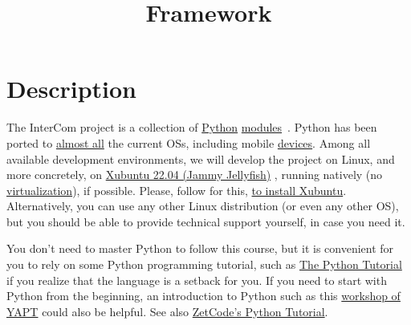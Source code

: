 
\title{Framework}

\maketitle

\section{Description}

The InterCom project \cite{intercom} is a collection of
\href{https://www.python.org/}{Python}
\href{https://docs.python.org/3/tutorial/modules.html#modules}{modules}~\cite{python}.
Python has been ported to
\href{https://www.python.org/download/other/}{almost all} the current
OSs, including mobile \href{https://kivy.org/#home}{devices}. Among
all available development environments, we will develop the project on
Linux, and more concretely, on
\href{https://xubuntu.org/download/}{Xubuntu 22.04 (Jammy Jellyfish)}
\cite{xubuntu}, running natively (no
\href{https://en.wikipedia.org/wiki/Virtualization}{virtualization}),
if possible. Please, follow for this,
\href{https://vicente-gonzalez-ruiz.github.io/Xubuntu_install/}{to
  install Xubuntu}. Alternatively, you can use any other Linux
distribution (or even any other OS), but you should be able to
provide technical support yourself, in case you need it.

You don't need to master Python to follow this course, but it is
convenient for you to rely on some Python programming tutorial, such
as \href{https://docs.python.org/3/tutorial/}{The Python Tutorial}
\cite{python-tutorial} if you realize that the language is a setback
for you. If you need to start with Python from the beginning, an
introduction to Python such as this
\href{https://github.com/vicente-gonzalez-ruiz/YAPT/tree/master/workshops/programacion_python_ESO}{workshop
  of YAPT} \cite{YAPT} could also be helpful. See also
\href{http://zetcode.com/lang/python/}{ZetCode's Python
  Tutorial}.

